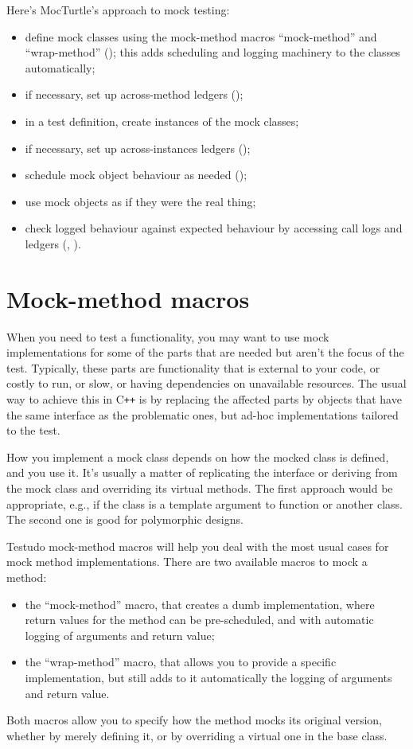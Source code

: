 \documentclass[twoside, a4paper, article]{memoir}
\newcommand*\Cpp{C\texttt{++}}
\begin{document}
Here's MocTurtle's approach to mock testing:
\begin{itemize}
\item define mock classes using the mock-method macros ``mock-method'' and
  ``wrap-method'' (); this adds scheduling and
  logging machinery to the classes automatically;
\item if necessary, set up across-method ledgers
  ();
\item in a test definition, create instances of the mock classes;
\item if necessary, set up across-instances ledgers
  ();
\item schedule mock object behaviour as needed
  ();
\item use mock objects as if they were the real thing;
\item check logged behaviour against expected behaviour by accessing call logs
  and ledgers (, ).
\end{itemize}

\section{Mock-method macros}
\label{sec:mock-method-macros}

When you need to test a functionality, you may want to use mock implementations
for some of the parts that are needed but aren't the focus of the test.
Typically, these parts are functionality that is external to your code, or
costly to run, or slow, or having dependencies on unavailable resources.  The
usual way to achieve this in \Cpp{} is by replacing the affected parts by
objects that have the same interface as the problematic ones, but ad-hoc
implementations tailored to the test.

How you implement a mock class depends on how the mocked class is defined, and
you use it.  It's usually a matter of replicating the interface or deriving
from the mock class and overriding its virtual methods.  The first approach
would be appropriate, e.g., if the class is a template argument to function or
another class.  The second one is good for polymorphic designs.

Testudo mock-method macros will help you deal with the most usual cases for
mock method implementations.  There are two available macros to mock a method:
\begin{itemize}
\item the ``mock-method'' macro, that creates a dumb implementation, where
  return values for the method can be pre-scheduled, and with automatic
  logging of arguments and return value;
\item the ``wrap-method'' macro, that allows you to provide a specific
  implementation, but still adds to it automatically the logging of arguments
  and return value.
\end{itemize}
Both macros allow you to specify how the method mocks its original version,
whether by merely defining it, or by overriding a virtual one in the base
class.
\end{document}
